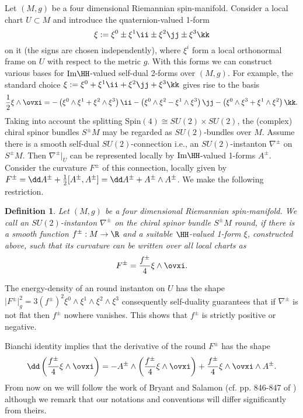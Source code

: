 \documentclass[a4paper,12pt,draft]{article}
\newtheorem{definition}[theorem]{Definition}
\begin{document}
Let $(M,g)$ be a four dimensional Riemannian
spin-manifold. Consider a local chart $U\subset M$ and 
introduce the quaternion-valued 1-form
\[\xi :=\xi^0\pm\xi^1\ii\pm\xi^2\jj\pm\xi^3\kk\]
on it (the signs are chosen independently), where $\xi^i$ form a local
orthonormal frame on $U$ with respect to
the metric $g$. With this forms we can construct various bases for 
${\rm Im}\HH$-valued self-dual 2-forms over $(M,g)$. For example, 
the standard choice $\xi :=\xi^0 +\xi^1\ii +\xi^2\jj +\xi^3\kk$ gives rise
to the basis 
\begin{equation}
{1\over 2}\xi\wedge\ovxi =
-\left(\xi^0\wedge\xi^1+\xi^2\wedge\xi^3\right)\ii
-\left(\xi^0\wedge\xi^2-\xi^1\wedge\xi^3\right)\jj
-\left(\xi^0\wedge\xi^3+\xi^1\wedge\xi^2\right)\kk .
\label{gombbazis}
\end{equation}
Taking into account the splitting Spin$(4)\cong SU(2)\times
SU(2)$, the (complex) chiral spinor bundles $S^\pm M$ may be regarded as
$SU(2)$-bundles over $M$. Assume there is a smooth self-dual
$SU(2)$-connection i.e., an $SU(2)$-instanton $\nabla^\pm$ on $S^\pm
M$. Then $\nabla^\pm\vert_U$ can
be represented locally by ${\rm Im}\HH$-valued 1-forms $A^\pm$. Consider the
curvature $F^\pm$ of this connection, locally given by $F^\pm =\dd
A^\pm +{1\over 2}[A^\pm , A^\pm ]=\dd A^\pm +A^\pm\wedge A^\pm$. We make
the following restriction.
\begin{definition}
Let $(M, g)$ be a four dimensional Riemannian spin-manifold. We call an
$SU(2)$-instanton $\nabla^\pm$ on the chiral spinor bundle $S^\pm M$ {\rm
round}, if there is a smooth function $f^\pm : M\rightarrow\R$ and a
suitable $\HH$-valued 1-form $\xi$, constructed above, such that its
curvature can be written over all local charts as 
\begin{equation}
F^\pm ={f^\pm\over 4}\xi\wedge\ovxi .
\label{folteves}
\end{equation}
\end{definition}
The energy-density of an round instanton on $U$ has the
shape $\vert F^\pm\vert^2_g
=3(f^\pm)^2\xi^0\wedge\xi^1\wedge\xi^2\wedge\xi^3$
consequently self-duality guarantees that if $\nabla^\pm$ is not flat then
$f^\pm$ nowhere vanishes. This shows that $f^\pm$ is strictly 
positive or negative. 

Bianchi identity implies that the derivative of the round $F^\pm$
has the shape 
\begin{equation}
\dd\left({f^\pm\over 4}\xi\wedge\ovxi\right) =-A^\pm\wedge \left(
{f^\pm\over 4}\xi\wedge\ovxi\right) +{f^\pm\over 4}\xi\wedge
\ovxi\wedge A^\pm.
\label{xiderivalt}
\end{equation}
From now on we will follow the work of Bryant and Salamon
(cf. pp. 846-847 of \cite{bry-sal}) although we remark that our notations
and conventions will differ significantly from theirs. 
 
\end{document}
